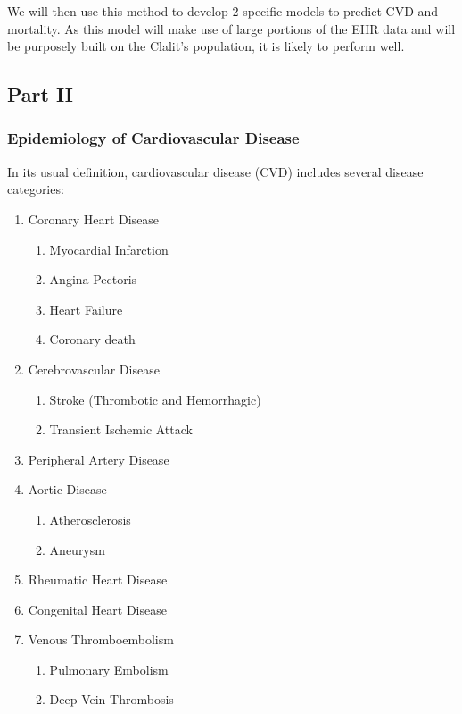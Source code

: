 \documentclass[a4paper,12pt]{article}
\begin{document}
		We will then use this method to develop 2 specific models to predict CVD and mortality. As this model will make use of large portions of the EHR data and will be purposely built on the Clalit's population, it is likely to perform well.
		
		\subsection{Part II}
		
			\subsubsection{Epidemiology of Cardiovascular Disease}
			
			In its usual definition, cardiovascular disease (CVD) includes several disease categories\cite{WHO2017}:
			\begin{enumerate}
				\item Coronary Heart Disease
				\begin{enumerate}
					\item Myocardial Infarction
					\item Angina Pectoris
					\item Heart Failure
					\item Coronary death
				\end{enumerate}
				\item Cerebrovascular Disease
				\begin{enumerate}
					\item Stroke (Thrombotic and Hemorrhagic)
					\item Transient Ischemic Attack
				\end{enumerate}
				\item Peripheral Artery Disease
				\item Aortic Disease
				\begin{enumerate}
					\item Atherosclerosis
					\item Aneurysm
				\end{enumerate}
				\item Rheumatic Heart Disease
				\item Congenital Heart Disease
				\item Venous Thromboembolism
				\begin{enumerate}
					\item Pulmonary Embolism
					\item Deep Vein Thrombosis
				\end{enumerate}
			\end{enumerate}
		
\end{document}
